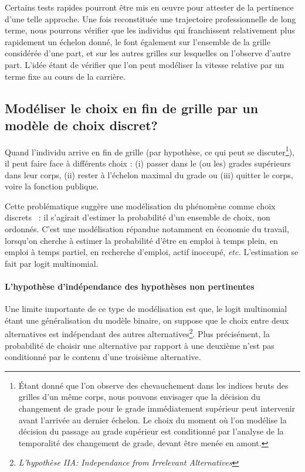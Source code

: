 \documentclass[11pt,a4paper]{article}
\begin{document}
Certains tests rapides pourront être mis en \oe uvre pour attester de la pertinence d'une telle approche. Une fois reconstituée une trajectoire professionnelle de long terme, nous pourrons vérifier que les individus qui franchissent relativement plus rapidement un échelon donné, le font également sur l'ensemble de la grille considérée d'une part, et sur les autres grilles sur lesquelles on l'observe d'autre part. L'idée étant de vérifier que l'on peut modéliser la vitesse relative par un terme fixe au cours de la carrière. 


\subsection{Modéliser le \og choix \fg{} en fin de grille par un modèle de choix discret?}

Quand l'individu arrive en fin de grille (par hypothèse, ce qui peut se discuter\footnote{Étant donné que l'on observe des chevauchement dans les indices bruts des grilles d'un même corps, nous pouvons envisager que la décision du changement de grade pour le grade immédiatement supérieur peut intervenir avant l'arrivée au dernier échelon. Le choix du moment où l'on modélise la décision du passage au grade supérieur est conditionné par l'analyse de la temporalité des changement de grade, devant être menée en amont. }), il peut faire face à différents \og choix \fg{}: (i) passer dans le (ou les) grades supérieurs dans leur corps, (ii) rester à l'échelon maximal du grade ou (iii) quitter le corps, voire la fonction publique. 

Cette problématique suggère une modélisation du phénomène comme \og choix discrets \fg\ : il s'agirait d'estimer la probabilité d'un ensemble de choix, non ordonnés.
C'est une modélisation répandue notamment en économie du travail, lorsqu'on cherche à estimer la probabilité d'être en emploi à temps plein, en emploi à temps partiel,
en recherche d'emploi, actif inoccupé, \textit{etc.} L'estimation se fait par logit multinomial.



\paragraph{L'hypothèse d'indépendance des hypothèses non pertinentes} Une limite importante de ce type de modélisation est que, le logit multinomial étant une généralisation du modèle binaire, on suppose que le choix entre deux alternatives est indépendant des autres alternatives\footnote{\textit{L'hypothèse IIA: Independance from Irrelevant Alternatives}}. Plus précisément, la probabilité de choisir une alternative par rapport à une deuxième n'est pas conditionné par le contenu d'une troisième alternative. 
\end{document}
